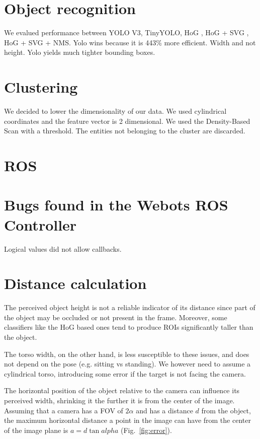 \documentclass[a4paper]{article}
\begin{document}
	\section{Object recognition}
	We evalued performance between YOLO V3, TinyYOLO, HoG , HoG + SVG  , HoG + SVG + NMS. Yolo wins because it is 443\% more efficient. Width and not height. Yolo yields much tighter bounding boxes. 
	
	\section{Clustering}
	We decided to lower the dimensionality of our data. We used cylindrical coordinates and the feature vector is 2 dimensional.
	We used the Density-Based Scan with a threshold. The entities not belonging to the cluster are discarded.
	
	\section{ROS}
	
	\section{Bugs found in the Webots ROS Controller}
	Logical values did not allow callbacks.
	

	\section{Distance calculation}\label{sec:Distance-calculation}
	The perceived object height is not a reliable indicator of its distance
	since part of the object may be occluded or not present in the frame.
	Moreover, some classifiers like the HoG based ones tend to produce ROIs
	significantly taller than the object.
	
	The torso width, on the other hand, is less susceptible to these issues,
	and does not depend on the pose (e.g. sitting vs standing). We however need
	to assume a cylindrical torso, introducing some error if the target is not
	facing the camera.

	The horizontal position of the object relative to the camera can influence
	its perceived width, shrinking it the further it is from the center of the
	image.  Assuming that a camera has a FOV of $2\alpha$ and has a distance
	$d$ from the object, the maximum horizontal distance a point in the image
	can have from the center of the image plane is $a = d \tan alpha$
	(Fig.~\ref{fig:error}).
\end{document}

